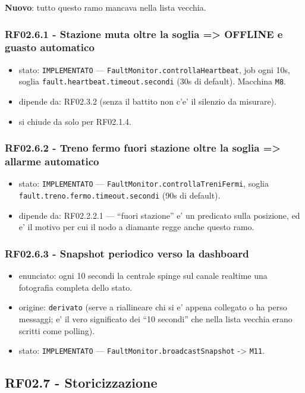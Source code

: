 \documentclass[11pt]{article}
\begin{document}
\textbf{Nuovo}: tutto questo ramo mancava nella lista vecchia.
\subsubsection{RF02.6.1 - Stazione muta oltre la soglia => OFFLINE e guasto automatico}
\label{sec:org40ff0fe}
\begin{itemize}
\item stato: \texttt{IMPLEMENTATO} — \texttt{FaultMonitor.controllaHeartbeat}, job ogni 10s, soglia
\texttt{fault.heartbeat.timeout.secondi} (30s di default). Macchina \texttt{M8}.
\item dipende da: RF02.3.2 (senza il battito non c'e' il silenzio da misurare).
\item si chiude da solo per RF02.1.4.
\end{itemize}
\subsubsection{RF02.6.2 - Treno fermo fuori stazione oltre la soglia => allarme automatico}
\label{sec:orgca2929c}
\begin{itemize}
\item stato: \texttt{IMPLEMENTATO} — \texttt{FaultMonitor.controllaTreniFermi}, soglia
\texttt{fault.treno.fermo.timeout.secondi} (90s di default).
\item dipende da: RF02.2.2.1 — ``fuori stazione'' e' un predicato sulla posizione, ed e' il motivo per cui
il nodo a diamante regge anche questo ramo.
\end{itemize}
\subsubsection{RF02.6.3 - Snapshot periodico verso la dashboard}
\label{sec:orgcf15ddc}
\begin{itemize}
\item enunciato: ogni 10 secondi la centrale spinge sul canale realtime una fotografia completa dello
stato.
\item origine: \texttt{derivato} (serve a riallineare chi si e' appena collegato o ha perso messaggi; e' il
vero significato dei ``10 secondi'' che nella lista vecchia erano scritti come polling).
\item stato: \texttt{IMPLEMENTATO} — \texttt{FaultMonitor.broadcastSnapshot} -> \texttt{M11}.
\end{itemize}
\subsection{RF02.7 - Storicizzazione}
\label{sec:org53d354f}
\end{document}

